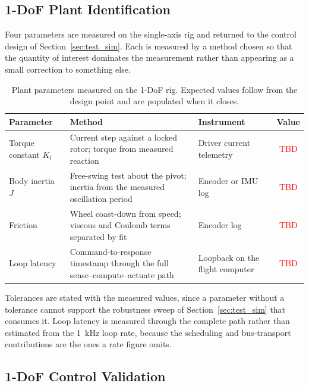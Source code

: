 \subsection{1-DoF Plant Identification}
\label{sec:test_paramid}

Four parameters are measured on the single-axis rig and returned to the control
design of Section~\ref{sec:test_sim}. Each is measured by a method chosen so that
the quantity of interest dominates the measurement rather than appearing as a
small correction to something else.

\begin{table}[htbp]
\centering
\caption[Plant parameters measured on the 1-DoF rig]{Plant parameters measured on the 1-DoF rig. Expected values follow from
the design point and are populated when it closes.}
\label{tab:paramid_methods}
\small
\setlength{\tabcolsep}{4pt}
\begin{tabular}{L{2.9cm} L{6.1cm} L{2.6cm} c}
\toprule
Parameter & Method & Instrument & Value \\
\midrule
Torque constant $K_t$ & Current step against a locked rotor; torque from measured reaction & Driver current telemetry & \textcolor{red}{TBD} \\
Body inertia $J$ & Free-swing test about the pivot; inertia from the measured oscillation period & Encoder or IMU log & \textcolor{red}{TBD} \\
Friction & Wheel coast-down from speed; viscous and Coulomb terms separated by fit & Encoder log & \textcolor{red}{TBD} \\
Loop latency & Command-to-response timestamp through the full sense--compute--actuate path & Loopback on the flight computer & \textcolor{red}{TBD} \\
\bottomrule
\end{tabular}
\end{table}

Tolerances are stated with the measured values, since a parameter without a
tolerance cannot support the robustness sweep of Section~\ref{sec:test_sim} that
consumes it. Loop latency is measured through the complete path rather than
estimated from the \qty{1}{\kilo\hertz} loop rate, because the scheduling and
bus-transport contributions are the ones a rate figure omits.

\subsection{1-DoF Control Validation}
\label{sec:test_1dof}

